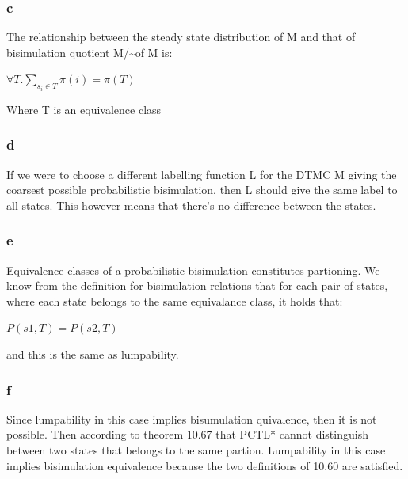 \subsubsection{c}
The relationship between the steady state distribution of M and that of bisimulation quotient M/\sim of M is:

$\forall T. \sum_{s_i \in T} \pi(i)=\pi(T)$

Where T is an equivalence class

\subsubsection{d}
If we were to choose a different labelling function L for the DTMC M giving the coarsest possible probabilistic bisimulation, then L should give the same label to all states.
This however means that there's no difference between the states.

\subsubsection{e}
Equivalence classes of a probabilistic bisimulation constitutes partioning. We know from the definition for bisimulation relations that for each pair of states, where each state belongs to the same
equivalance class, it holds that:

$P(s1,T)=P(s2,T)$

and this is the same as lumpability.

\subsubsection{f}
Since lumpability in this case implies bisumulation quivalence, then it is not possible. Then according to theorem 10.67 that PCTL* cannot distinguish between two states that belongs to the same partion.
Lumpability in this case implies bisimulation equivalence because the two definitions of 10.60 are satisfied.
